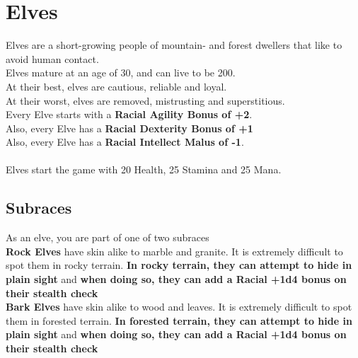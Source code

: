 \section{Elves}\label{race:elves}
Elves are a short-growing people of mountain- and forest dwellers that like to avoid human contact.\\
Elves mature at an age of 30, and can live to be 200.\\
At their best, elves are cautious, reliable and loyal.\\
At their worst, elves are removed, mistrusting and superstitious.\\
Every Elve starts with a \textbf{Racial Agility Bonus of +2}.\\
Also, every Elve has a \textbf{Racial Dexterity Bonus of +1}\\
Also, every Elve has a \textbf{Racial Intellect Malus of -1}.\\\\
Elves start the game with 20 Health, 25 Stamina and 25 Mana.\\


\subsection{Subraces}
As an elve, you are part of one of two subraces\\

\textbf{Rock Elves} have skin alike to marble and granite.
It is extremely difficult to spot them in rocky terrain.
\textbf{In rocky terrain, they can attempt to hide in plain sight} and \textbf{when doing so, they can add a Racial +1d4 bonus on their stealth check}\\

\textbf{Bark Elves} have skin alike to wood and leaves.
It is extremely difficult to spot them in forested terrain.
\textbf{In forested terrain, they can attempt to hide in plain sight} and \textbf{when doing so, they can add a Racial +1d4 bonus on their stealth check}